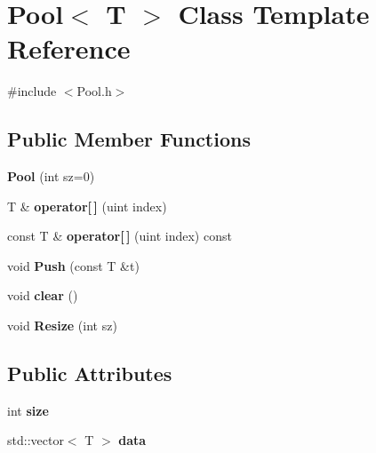 \hypertarget{classPool}{}\section{Pool$<$ T $>$ Class Template Reference}
\label{classPool}


{\ttfamily \#include $<$Pool.\+h$>$}

\subsection*{Public Member Functions}
\begin{DoxyCompactItemize}
\item 
\hypertarget{classPool_a88910c57fb7099ac3219d5d232cb6d3d}{}{\bfseries Pool} (int sz=0)\label{classPool_a88910c57fb7099ac3219d5d232cb6d3d}

\item 
\hypertarget{classPool_ac4076ad218acab283dacc29e8e2cf855}{}T \& {\bfseries operator\mbox{[}$\,$\mbox{]}} (uint index)\label{classPool_ac4076ad218acab283dacc29e8e2cf855}

\item 
\hypertarget{classPool_a2835287a3cea43e35387d797544d27da}{}const T \& {\bfseries operator\mbox{[}$\,$\mbox{]}} (uint index) const \label{classPool_a2835287a3cea43e35387d797544d27da}

\item 
\hypertarget{classPool_acbec03f17980c373ecf27ed2db420d7b}{}void {\bfseries Push} (const T \&t)\label{classPool_acbec03f17980c373ecf27ed2db420d7b}

\item 
\hypertarget{classPool_aae8e8528b907d7339af05685ba49aa92}{}void {\bfseries clear} ()\label{classPool_aae8e8528b907d7339af05685ba49aa92}

\item 
\hypertarget{classPool_a222fddc3bb5683f5391ee94ebf3f5147}{}void {\bfseries Resize} (int sz)\label{classPool_a222fddc3bb5683f5391ee94ebf3f5147}

\end{DoxyCompactItemize}
\subsection*{Public Attributes}
\begin{DoxyCompactItemize}
\item 
\hypertarget{classPool_a2c33796e829a9c6d536a85b7ad62d309}{}int {\bfseries size}\label{classPool_a2c33796e829a9c6d536a85b7ad62d309}

\item 
\hypertarget{classPool_a9a3a4597a8e96a97b2186f972104f196}{}std\+::vector$<$ T $>$ {\bfseries data}\label{classPool_a9a3a4597a8e96a97b2186f972104f196}

\end{DoxyCompactItemize}


